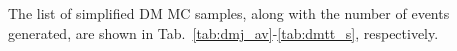The list of simplified DM MC samples, along with the number of events 
generated, are shown in Tab.~\ref{tab:dmj_av}-\ref{tab:dmtt_s}, respectively.


